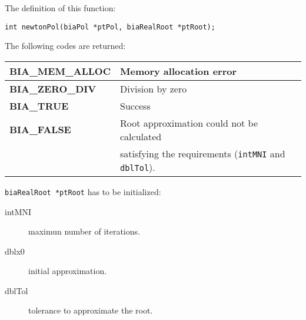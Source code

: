 The definition of this function:
%
\begin{verbatim}
int newtonPol(biaPol *ptPol, biaRealRoot *ptRoot);  
\end{verbatim}
%
The following codes are returned:
%
\begin{center}
\begin{tabular}{|l|l|}
\hline
\textbf{BIA\_MEM\_ALLOC} & Memory allocation error \\
\hline
\textbf{BIA\_ZERO\_DIV} & Division by zero \\
\hline
\textbf{BIA\_TRUE} & Success \\
\hline
\textbf{BIA\_FALSE} & Root approximation could not be calculated \\
                    & satisfying the requirements (\texttt{intMNI} and \texttt{dblTol}). \\
\hline
\end{tabular}
\end{center}

\texttt{biaRealRoot *ptRoot} has to be initialized:
%
\begin{description}
\item[intMNI] maximun number of iterations.
\item[dblx0] initial approximation.
\item[dblTol] tolerance to approximate the root.
\end{description}
%
%
\ \\ \\ \\
%






